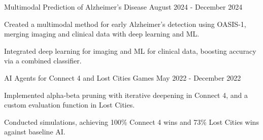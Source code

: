 \documentclass[10pt, letterpaper]{article}
\begin{document}
\vspace{\entrySpacing}
\begin{projectentry}
    {Multimodal Prediction of Alzheimer's Disease} %
    {August 2024 - December 2024} %
    \item Created a multimodal method for early Alzheimer's detection using OASIS-1, merging imaging and clinical data with deep learning and ML.
    \item Integrated deep learning for imaging and ML for clinical data, boosting accuracy via a combined classifier.
\end{projectentry}

\vspace{\entrySpacing}
\begin{projectentry}
    {AI Agents for Connect 4 and Lost Cities Games} %
    {May 2022 - December 2022} %
    \item Implemented alpha-beta pruning with iterative deepening in Connect 4, and a custom evaluation function in Lost Cities.
    \item Conducted simulations, achieving 100\% Connect 4 wins and 73\% Lost Cities wins against baseline AI.
\end{projectentry}

\end{document}
